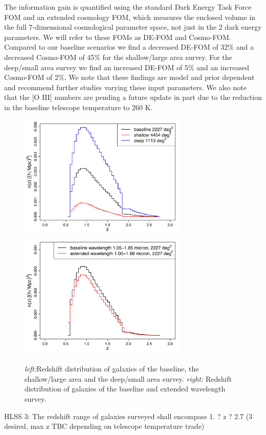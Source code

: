 The information gain is quantified using the standard Dark Energy Task Force FOM and an extended cosmology FOM, which measures the enclosed volume in the full 7-dimensional cosmological parameter space, not just in the 2 dark energy parameters. We will refer to these FOMs as DE-FOM and Cosmo-FOM. 
Compared to our baseline scenarios we find a decreased DE-FOM of 32\% and a decreased Cosmo-FOM of 45\% for the shallow/large area survey. For the deep/small area survey we find an increased DE-FOM of 5\% and an increased Cosmo-FOM of 2\%. We note that these findings are model and prior dependent and recommend further studies varying these input parameters. We also note that the [O III] numbers are pending a future update in part due to the reduction in the baseline telescope temperature to 260 K.
\begin{figure}
  \includegraphics[width=8.0cm]{Plots/forecasts/forecast_1}
  \includegraphics[width=8.0cm]{Plots/forecasts/forecast_2}
   \caption{\textit{left:}Redshift distribution of galaxies of the baseline, the shallow/large area and the deep/small area survey. \textit{right:} Redshift distribution of galaxies of the baseline and extended wavelength survey. 
}
  \label{fi:forecast1}
\end{figure}

HLSS 3: The redshift range of galaxies surveyed shall encompass 1. ? z ? 2.7 (3 desired, max z TBC depending on telescope temperature trade)


